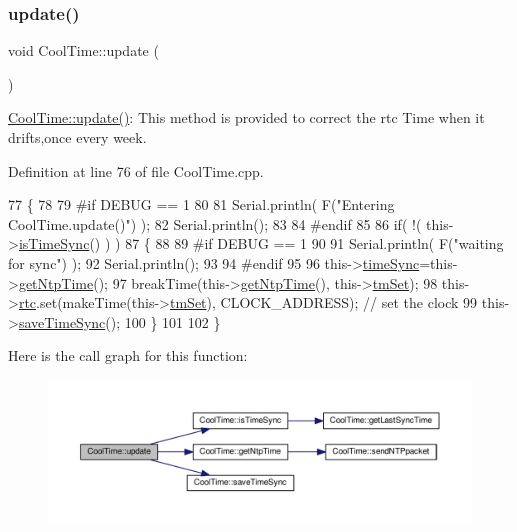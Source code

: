 \subsubsection{\texorpdfstring{update()}{update()}}
{\footnotesize\ttfamily void Cool\+Time\+::update (\begin{DoxyParamCaption}{ }\end{DoxyParamCaption})}

\hyperlink{class_cool_time_aae601f795452cfa48d9fb337aed483a8}{Cool\+Time\+::update()}\+: This method is provided to correct the rtc Time when it drifts,once every week. 

Definition at line 76 of file Cool\+Time.\+cpp.


\begin{DoxyCode}
77 \{
78 
79 \textcolor{preprocessor}{#if DEBUG == 1}
80 
81     Serial.println( F(\textcolor{stringliteral}{"Entering CoolTime.update()"}) );
82     Serial.println();
83 
84 \textcolor{preprocessor}{#endif }
85 
86     \textcolor{keywordflow}{if}( !( this->\hyperlink{class_cool_time_a5ae038a4498602b189f76a10bf02adf8}{isTimeSync}() ) )
87     \{
88     
89 \textcolor{preprocessor}{    #if DEBUG == 1}
90 
91         Serial.println( F(\textcolor{stringliteral}{"waiting for sync"}) );
92         Serial.println();
93 
94 \textcolor{preprocessor}{    #endif }
95 
96         this->\hyperlink{class_cool_time_a9d032e76c3470a15b3bbbc52af6463f7}{timeSync}=this->\hyperlink{class_cool_time_a41fbbbfd651c2079f54d4b2911e4c705}{getNtpTime}();
97         breakTime(this->\hyperlink{class_cool_time_a41fbbbfd651c2079f54d4b2911e4c705}{getNtpTime}(), this->\hyperlink{class_cool_time_ad33c2713c903ff064ad09c46406ae088}{tmSet});
98         this->\hyperlink{class_cool_time_abd38f2384ff90692b1568d9db869412e}{rtc}.set(makeTime(this->\hyperlink{class_cool_time_ad33c2713c903ff064ad09c46406ae088}{tmSet}), CLOCK\_ADDRESS); \textcolor{comment}{// set the clock}
99         this->\hyperlink{class_cool_time_ae9658c9b377510d469e3b88edf33ee85}{saveTimeSync}();
100     \}
101     
102 \}
\end{DoxyCode}
Here is the call graph for this function\+:\nopagebreak
\begin{figure}[H]
\begin{center}
\leavevmode
\includegraphics[width=350pt]{d6/d49/class_cool_time_aae601f795452cfa48d9fb337aed483a8_cgraph}
\end{center}
\end{figure}

